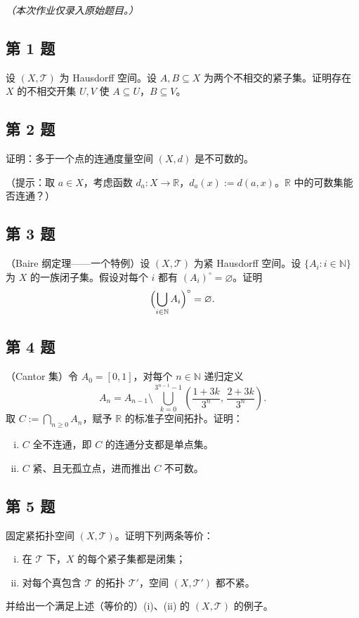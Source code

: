 \documentclass[11pt,a4paper]{article}
\newcommand{\R}{\mathbb{R}}
\newcommand{\N}{\mathbb{N}}
\theoremstyle{definition}
\begin{document}
\textit{（本次作业仅录入原始题目。）}

\subsection{第 1 题}

设 $(X, \mathcal{T})$ 为 Hausdorff 空间。设 $A, B \subseteq X$ 为两个不相交的紧子集。证明存在 $X$ 的不相交开集 $U, V$ 使 $A \subseteq U$，$B \subseteq V$。

\subsection{第 2 题}

证明：多于一个点的连通度量空间 $(X, d)$ 是不可数的。

（提示：取 $a \in X$，考虑函数 $d_a : X \to \R$，$d_a(x) := d(a,x)$。$\R$ 中的可数集能否连通？）

\subsection{第 3 题}

（Baire 纲定理——一个特例）设 $(X, \mathcal{T})$ 为紧 Hausdorff 空间。设 $\{A_i : i \in \N\}$ 为 $X$ 的一族闭子集。假设对每个 $i$ 都有 $(A_i)^\circ = \varnothing$。证明
\[
  \Bigl(\bigcup_{i \in \N} A_i\Bigr)^\circ = \varnothing.
\]

\subsection{第 4 题}

（Cantor 集）令 $A_0 = [0,1]$，对每个 $n \in \N$ 递归定义
\[
  A_n = A_{n-1} \setminus \bigcup_{k=0}^{3^{n-1}-1} \left(\frac{1+3k}{3^n},\,\frac{2+3k}{3^n}\right).
\]
取 $C := \bigcap_{n \ge 0} A_n$，赋予 $\R$ 的标准子空间拓扑。证明：
\begin{enumerate}[(i)]
  \item $C$ 全不连通，即 $C$ 的连通分支都是单点集。
  \item $C$ 紧、且无孤立点，进而推出 $C$ 不可数。
\end{enumerate}

\subsection{第 5 题}

固定紧拓扑空间 $(X, \mathcal{T})$。证明下列两条等价：
\begin{enumerate}[(i)]
  \item 在 $\mathcal{T}$ 下，$X$ 的每个紧子集都是闭集；
  \item 对每个真包含 $\mathcal{T}$ 的拓扑 $\mathcal{T}'$，空间 $(X, \mathcal{T}')$ 都不紧。
\end{enumerate}
并给出一个满足上述（等价的）(i)、(ii) 的 $(X, \mathcal{T})$ 的例子。
\end{document}
